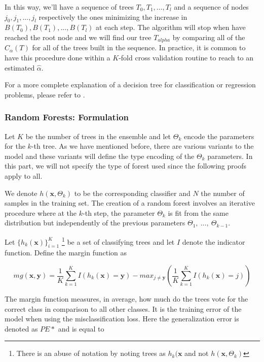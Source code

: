 In this way, we'll have a sequence of trees $T_0,T_1,...,T_l$ and a sequence of nodes $j_0, j_1,...,j_l$ respectively the ones minimizing the increase in $B(T_0),B(T_1),...,B(T_l)$ at each step. The algorithm will stop when have reached the root node and we will find our tree $T_{alpha}$ by comparing all of the $C_\alpha(T)$ for all of the trees built in the sequence. In practice, it is common to have this procedure done within a $K$-fold cross validation routine to reach to an estimated $\hat{\alpha}$.

For a more complete explanation of a decision tree for classification or regression problems, please refer to \textcite{breiman-cart84}.

\textit{}

\subsubsection{ Random Forests: Formulation }


Let $K$  be the number of trees in the ensemble and let $\Theta_k$ encode the parameters for the $k$-th tree. As we have mentioned before, there are various variants to the model and these variants will define the type encoding of the $\Theta_k$ parameters. In this part, we will not specify the type of forest used since the following proofs apply to all.

We denote $h(\textbf{x},\Theta_k)$ to be the corresponding classifier and $N$ the number of samples in the training set. The creation of a random forest involves an iterative procedure where at the $k$-th step, the parameter $\Theta_k$ is fit from the same distribution but independently of the previous parameters $\Theta_1, \ ..., \ \Theta_{k-1}$. %


Let $\{h_k(\textbf{x})\}_{i=1}^K$  \footnote{There is an abuse of notation by noting trees as $h_k(\textbf{x}$ and not $h(\textbf{x}, \Theta_k)$ } be a set of classifying trees and let $I$ denote the indicator function.  Define the margin function as

\begin{equation}
mg(\textbf{x},\textbf{y}) =  \frac{1}{K}   \sum_{k=1}^K I(h_k(\textbf{x}) = \textbf{y})
- max_{j\neq \textbf{y}}\left(\frac{1}{K} \sum_{k=1}^K I(h_k(\textbf{x}) = j) \right) 
\end{equation} \label{eq:rf-marginFun}

The margin function measures, in average, how much do the trees vote for the correct class in comparison to all other classes. It is the training error of the model when using the misclassification loss. Here the generalization error is denoted as $PE*$ and is equal to  


